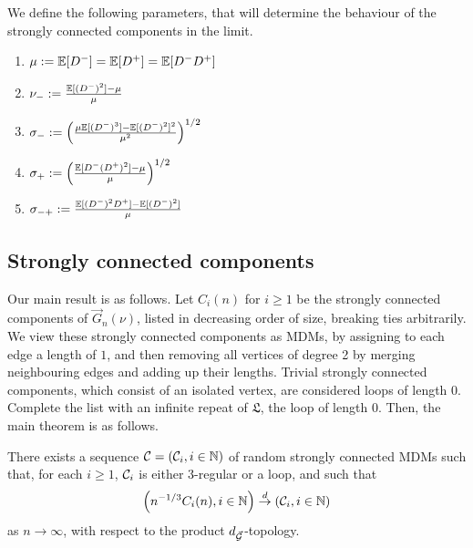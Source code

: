 We define the following parameters, that will determine the behaviour of the strongly connected components in the limit.
\begin{enumerate}
    \item $\mu:={\mathbb E}[D^-]={\mathbb E}[D^+]={\mathbb E}[D^-D^+]$
    \item $\nu_-:=\frac{{\mathbb E}[(D^-)^2]-\mu}{\mu}$ 
    \item $\sigma_-:=\left(\frac{\mu{\mathbb E}[(D^-)^3]-{\mathbb E}[(D^-)^2]^2}{\mu^2}\right)^{1/2}$ 
    \item $\sigma_+:=\left(\frac{{\mathbb E}[D^-(D^+)^2]-\mu}{\mu}\right)^{1/2}$ 
    \item $\sigma_{-+}:=\frac{{\mathbb E}[(D^-)^2D^+]-{\mathbb E}[(D^-)^2]}{\mu}$ 
\end{enumerate}
\subsection{Strongly connected components}



Our main result is as follows. Let $C_i(n)$ for $i\geq 1$ be the strongly connected components of $\vec{G}_n(\nu)$, listed in decreasing order of size, breaking ties arbitrarily. We view these strongly connected components as MDMs, by assigning to each edge a length of $1$, and then removing all vertices of degree 2 by merging neighbouring edges and adding up their lengths. Trivial strongly connected components, which consist of an isolated vertex, are considered loops of length $0$. Complete the list with an infinite repeat of $\mathfrak{L}$, the loop of length $0$. Then, the main theorem is as follows.
\begin{theorem}\label{thm.main}
There exists a sequence ${\mathcal C}=({\mathcal C}_i,i\in {\mathbb N})$ of random strongly connected MDMs such that, for each $i\geq 1$, ${\mathcal C}_i$ is either $3$-regular or a loop, and such that 
$$\left(n^{-1/3}C_i(n),i\in {\mathbb N}\right)\overset{d}{\to}\left({\mathcal C}_i,i\in {\mathbb N}\right)$$
as $n\to \infty$, with respect to the product $d_{\vec{{\mathcal G}}}$-topology. 
\end{theorem}

